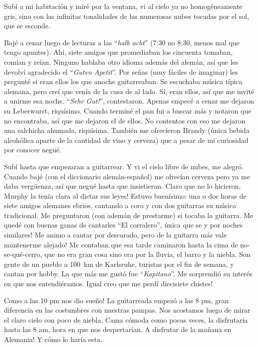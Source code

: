 Sub\'i a mi habitaci\'on y mir\'e por la ventana, vi al cielo ya no
homog\'eneamente gris, sino con las infinitas tonalidades de las numerosas
nubes tocadas por el sol, que se esconde.

Baj\'e a cenar luego de lecturas a las ``\emph{halb acht}'' (7:30 no 8:30,
menos mal que tengo apuntes). Ah\'i, siete amigos que promediaban los
cincuenta tomaban, com\'ian y re\'ian. Ninguno hablaba otro idioma adem\'as
del alem\'an, as\'i que les devolv\'i agradecido el ``\emph{Guten Apetit}''.
Por se\~nas (muy f\'aciles de imaginar) les pregunt\'e si eran ellos los que
anoche guitarreaban. Se escuchaba m\'usica t\'ipica alemana, pero cre\'i que
ven\'ia de la casa de al lado. S\'i, eran ellos, as\'i que me invit\'e a
unirme esa noche. ``\emph{Sehr Gut!}'', contestaron. Apenas empec\'e a cenar
me dejaron su Leberwurst, riqu\'isimo. Cuando termin\'e el pan fui a buscar
m\'as y notaron que no encontraba, as\'i que me dejaron el de ellos. No
contentos con eso me dejaron una salchicha ahumada, riqu\'isima. Tambi\'en me
ofrecieron Brandy (\'unica bebida alcoh\'olica aparte de la cantidad de vino y
cerveza) que a pesar de mi curiosidad por conocer negu\'e.

Sub\'i hasta que empezaran a guitarrear. Y vi el cielo libre de nubes, me
alegr\'o. Cuando baj\'e (con el diccionario alem\'an-espa\~nol) me ofrec\'ian
cerveza pero ya me daba verg\"uenza, as\'i que negu\'e hasta que insistieran.
Claro que no lo hicieron, \textexclamdown Murphy la ten\'ia clara al dictar
sus leyes! Estuvo buen\'isimo: una o dos horas de siete amigos alemanes
ebrios, cantando a coro y con dos guitarras su m\'usica tradicional. Me
preguntaron (con adem\'an de prestarme) si tocaba la guitarra. \textexclamdown
Me qued\'e con buenas ganas de cantarles ``El corralero'', \'unica que se y
por noches similares! Me animo a cantar por descarado, \textexclamdown pero de
la guitarra m\'as vale mantenerme alejado! Me contaban que esa tarde caminaron
hasta la cima de no-se-qu\'e-cerro, que no era gran cosa sino era por la
lluvia, el barro y la niebla. Son gente de un pueblo a 100~km de Karlsruhe,
turistas por el fin de semana, y cantan por hobby. La que m\'as me gust\'o
fue ``\emph{Kapitano}''. Me sorprendi\'o su inter\'es en que nos
entendi\'eramos. \textexclamdown Igual creo que me perd\'i diecisiete chistes!

\textexclamdown Como a las 10 pm nos dio sue\~no! La guitarreada empez\'o a
las 8 pm, gran diferencia en las costumbres con nuestras pampas. Nos acostamos
luego de mirar el claro cielo con poco de niebla. Cama c\'omoda como pocas
veces, la disfrutar\'ia hasta las 8 am, hora en que nos despertar\'ian.
\textexclamdown A disfrutar de la ma\~nana en Alemania! Y c\'omo lo har\'ia
esta.

